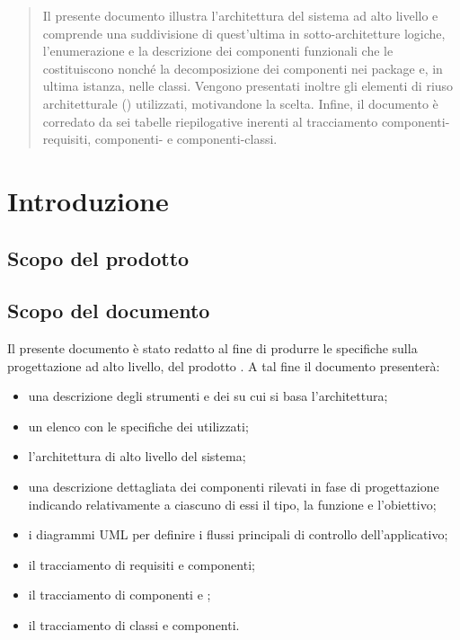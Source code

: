 

\setcounter{page}{1}
\pagestyle{normal}

\clearpage

\begin{abstract}
Il presente documento illustra l'architettura del sistema ad alto livello e comprende una suddivisione di quest'ultima in sotto-architetture logiche, l'enumerazione e la descrizione dei componenti funzionali che le costituiscono nonché la decomposizione dei componenti nei package e, in ultima istanza, nelle classi. Vengono presentati inoltre gli elementi di riuso architetturale () utilizzati, motivandone la scelta. Infine, il documento è corredato da sei tabelle riepilogative inerenti al tracciamento componenti-requisiti, componenti-\underline{} e componenti-classi.
\end{abstract}
\clearpage

\section{Introduzione}
\subsection{Scopo del prodotto}
\purpose

\subsection{Scopo del documento}
Il presente documento è stato redatto al fine di produrre le specifiche sulla progettazione ad alto livello, del prodotto \caName. A tal fine il documento presenterà:
\begin{itemize}
    \item una descrizione degli strumenti e dei \underline{} su cui si basa l'architettura;
	\item un elenco con le specifiche dei  utilizzati;
	\item l'architettura di alto livello del sistema;
	\item una descrizione dettagliata dei componenti rilevati in fase di progettazione indicando relativamente a ciascuno di essi il tipo, la funzione e l'obiettivo;
	\item i diagrammi UML per definire i flussi principali di controllo dell'applicativo;
	\item il tracciamento di requisiti e componenti;
	\item il tracciamento di componenti e ;
	\item il tracciamento di classi e componenti.
\end{itemize}

